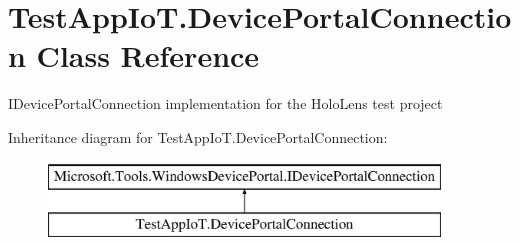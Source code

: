 \hypertarget{class_test_app_io_t_1_1_device_portal_connection}{}\section{Test\+App\+Io\+T.\+Device\+Portal\+Connection Class Reference}
\label{class_test_app_io_t_1_1_device_portal_connection}


I\+Device\+Portal\+Connection implementation for the Holo\+Lens test project  


Inheritance diagram for Test\+App\+Io\+T.\+Device\+Portal\+Connection\+:\begin{figure}[H]
\begin{center}
\leavevmode
\includegraphics[height=2.000000cm]{class_test_app_io_t_1_1_device_portal_connection}
\end{center}
\end{figure}
